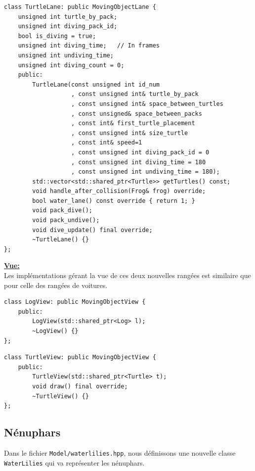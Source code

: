 \documentclass[a4paper, 12pt]{article}
\begin{document}
\begin{lstlisting}
class TurtleLane: public MovingObjectLane {
    unsigned int turtle_by_pack;
    unsigned int diving_pack_id;
    bool is_diving = true;
    unsigned int diving_time;   // In frames
    unsigned int undiving_time;
    unsigned int diving_count = 0;
    public:
        TurtleLane(const unsigned int id_num
                   , const unsigned int& turtle_by_pack
                   , const unsigned int& space_between_turtles
                   , const unsigned& space_between_packs
                   , const int& first_turtle_placement
                   , const unsigned int& size_turtle
                   , const int& speed=1
                   , const unsigned int diving_pack_id = 0
                   , const unsigned int diving_time = 180
                   , const unsigned int undiving_time = 180);
        std::vector<std::shared_ptr<Turtle>> getTurtles() const;
        void handle_after_collision(Frog& frog) override;
        bool water_lane() const override { return 1; }
        void pack_dive();
        void pack_undive();
        void dive_update() final override;
        ~TurtleLane() {}
};
\end{lstlisting} \hspace{0.5cm}


\underline{\textbf{Vue:}} \\
Les implémentations gérant la vue de ces deux nouvelles rangées est similaire que pour celle des rangées de voitures. \\
\begin{lstlisting}
class LogView: public MovingObjectView {
    public:
        LogView(std::shared_ptr<Log> l);
        ~LogView() {}
};
\end{lstlisting}

\begin{lstlisting}
class TurtleView: public MovingObjectView {
    public:
        TurtleView(std::shared_ptr<Turtle> t);
        void draw() final override;
        ~TurtleView() {}
};
\end{lstlisting}

\subsection{Nénuphars} \label{lilies}

Dans le fichier \texttt{Model/waterlilies.hpp}, nous définissons une nouvelle classe \texttt{WaterLilies} qui va représenter les nénuphars. \\
\end{document}
